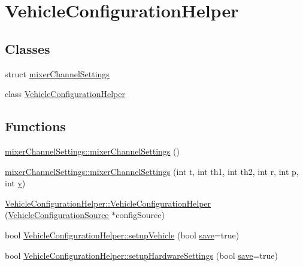 \hypertarget{group___vehicle_configuration_helper}{\section{\-Vehicle\-Configuration\-Helper}
\label{group___vehicle_configuration_helper}
}
\subsection*{\-Classes}
\begin{DoxyCompactItemize}
\item 
struct \hyperlink{structmixer_channel_settings}{mixer\-Channel\-Settings}
\item 
class \hyperlink{class_vehicle_configuration_helper}{\-Vehicle\-Configuration\-Helper}
\end{DoxyCompactItemize}
\subsection*{\-Functions}
\begin{DoxyCompactItemize}
\item 
\hyperlink{group___vehicle_configuration_helper_gad16199c03ec2dcfd31a6930c77e6a073}{mixer\-Channel\-Settings\-::mixer\-Channel\-Settings} ()
\item 
\hyperlink{group___vehicle_configuration_helper_ga7dfd912206868944ab15d6bf785e2325}{mixer\-Channel\-Settings\-::mixer\-Channel\-Settings} (int t, int th1, int th2, int r, int p, int \hyperlink{_o_p_plots_8m_a2fb1c5cf58867b5bbc9a1b145a86f3a0}{y})
\item 
\hyperlink{group___vehicle_configuration_helper_ga8d0681e69a65e5d227b2255abe8bb982}{\-Vehicle\-Configuration\-Helper\-::\-Vehicle\-Configuration\-Helper} (\hyperlink{class_vehicle_configuration_source}{\-Vehicle\-Configuration\-Source} $\ast$config\-Source)
\item 
bool \hyperlink{group___vehicle_configuration_helper_gaa307534a6b38e5b7e67060bc8d381b09}{\-Vehicle\-Configuration\-Helper\-::setup\-Vehicle} (bool \hyperlink{uavobjecttemplate_8m_a79178933c5b76091ca04178d14a5ba98}{save}=true)
\item 
bool \hyperlink{group___vehicle_configuration_helper_ga2762da9776a1c2608786cb7b1ff6ca6c}{\-Vehicle\-Configuration\-Helper\-::setup\-Hardware\-Settings} (bool \hyperlink{uavobjecttemplate_8m_a79178933c5b76091ca04178d14a5ba98}{save}=true)
\end{DoxyCompactItemize}
